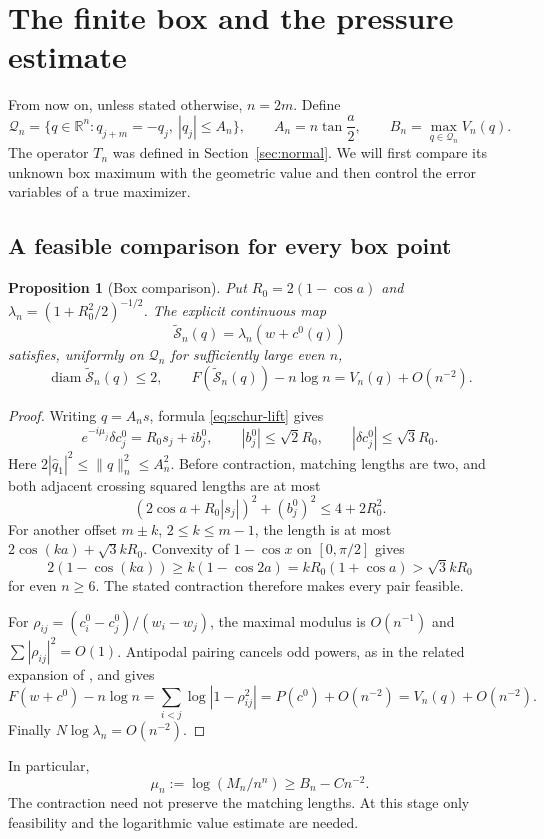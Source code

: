 \documentclass[11pt,reqno]{amsart}
\numberwithin{equation}{section}
\newtheorem{proposition}[theorem]{Proposition}
\theoremstyle{definition}
\theoremstyle{remark}
\newcommand{\R}{\mathbb R}
\newcommand{\norm}[1]{\lVert #1\rVert}
\newcommand{\dd}{\delta}
\DeclareMathOperator{\diam}{diam}
\begin{document}

\section{The finite box and the pressure estimate}\label{sec:pressure}
From now on, unless stated otherwise, $n=2m$. Define
\begin{equation}\label{eq:finite-box}
 \mathcal Q_n=\{q\in\R^n:q_{j+m}=-q_j,\ |q_j|\le A_n\},
 \qquad A_n=n\tan\frac a2,\qquad B_n=\max_{q\in\mathcal Q_n}V_n(q).
\end{equation}
The operator $T_n$ was defined in Section~\ref{sec:normal}. We will first compare its unknown box maximum with the geometric value and then control the error variables of a true maximizer.

\subsection{A feasible comparison for every box point}
\begin{proposition}[Box comparison]\label{prop:box-lift}
Put $R_0=2(1-\cos a)$ and $\lambda_n=(1+R_0^2/2)^{-1/2}$. The explicit continuous map
\[
 \widetilde{\mathcal S}_n(q)=\lambda_n(w+c^0(q))
\]
satisfies, uniformly on $\mathcal Q_n$ for sufficiently large even $n$,
\begin{equation}\label{eq:box-lift}
 \diam\widetilde{\mathcal S}_n(q)\le2,\qquad
 F(\widetilde{\mathcal S}_n(q))-n\log n=V_n(q)+O(n^{-2}).
\end{equation}
\end{proposition}
\begin{proof}
Writing $q=A_ns$, formula \eqref{eq:schur-lift} gives
\[
 e^{-i\mu_j}\dd c_j^0=R_0s_j+ib_j^0,\qquad
 |b_j^0|\le\sqrt2R_0,\qquad |\dd c_j^0|\le\sqrt3R_0.
\]
Here $2|\widehat q_1|^2\le\norm q_n^2\le A_n^2$. Before contraction, matching lengths are two, and both adjacent crossing squared lengths are at most
\[
 (2\cos a+R_0|s_j|)^2+(b_j^0)^2\le4+2R_0^2.
\]
For another offset $m\pm k$, $2\le k\le m-1$, the length is at most $2\cos(ka)+\sqrt3kR_0$. Convexity of $1-\cos x$ on $[0,\pi/2]$ gives
\[
 2(1-\cos(ka))\ge k(1-\cos2a)=kR_0(1+\cos a)>\sqrt3kR_0
\]
for even $n\ge6$. The stated contraction therefore makes every pair feasible.

For $\rho_{ij}=(c_i^0-c_j^0)/(w_i-w_j)$, the maximal modulus is $O(n^{-1})$ and $\sum|\rho_{ij}|^2=O(1)$. Antipodal pairing cancels odd powers, as in the related expansion of \cite[Section~4.2]{sothanaphan}, and gives
\begin{equation}\label{eq:antipodal-log}
 F(w+c^0)-n\log n=\sum_{i<j}\log|1-\rho_{ij}^2|
 =P(c^0)+O(n^{-2})=V_n(q)+O(n^{-2}).
\end{equation}
Finally $N\log\lambda_n=O(n^{-2})$.
\end{proof}
In particular,
\begin{equation}\label{eq:box-lower}
 \mu_n:=\log(M_n/n^n)\ge B_n-Cn^{-2}.
\end{equation}
The contraction need not preserve the matching lengths. At this stage only feasibility and the logarithmic value estimate are needed.
\end{document}
